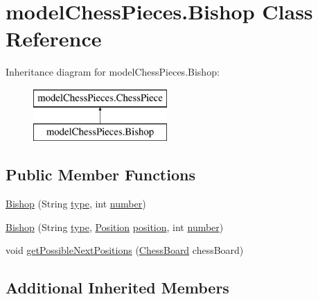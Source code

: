 \hypertarget{classmodel_chess_pieces_1_1_bishop}{\section{model\+Chess\+Pieces.\+Bishop Class Reference}
\label{classmodel_chess_pieces_1_1_bishop}
}
Inheritance diagram for model\+Chess\+Pieces.\+Bishop\+:\begin{figure}[H]
\begin{center}
\leavevmode
\includegraphics[height=2.000000cm]{classmodel_chess_pieces_1_1_bishop}
\end{center}
\end{figure}
\subsection*{Public Member Functions}
\begin{DoxyCompactItemize}
\item 
\hyperlink{classmodel_chess_pieces_1_1_bishop_ae2d6a71368f3304f8191acdf20949dc0}{Bishop} (String \hyperlink{classmodel_chess_pieces_1_1_chess_piece_a195487ca88c197af7c1604247be31db2}{type}, int \hyperlink{classmodel_chess_pieces_1_1_chess_piece_a979e63b99128333883acedc38d25dc87}{number})
\item 
\hyperlink{classmodel_chess_pieces_1_1_bishop_a224d00fc7396150863db9df71428a63c}{Bishop} (String \hyperlink{classmodel_chess_pieces_1_1_chess_piece_a195487ca88c197af7c1604247be31db2}{type}, \hyperlink{classmodel_core_1_1_position}{Position} \hyperlink{classmodel_chess_pieces_1_1_chess_piece_a3d4362d5b28f6edb14161196d9c6807d}{position}, int \hyperlink{classmodel_chess_pieces_1_1_chess_piece_a979e63b99128333883acedc38d25dc87}{number})
\item 
void \hyperlink{classmodel_chess_pieces_1_1_bishop_afff5e784f3f2cd4cb10cdf193aacaf25}{get\+Possible\+Next\+Positions} (\hyperlink{classmodel_core_1_1_chess_board}{Chess\+Board} chess\+Board)
\end{DoxyCompactItemize}
\subsection*{Additional Inherited Members}


